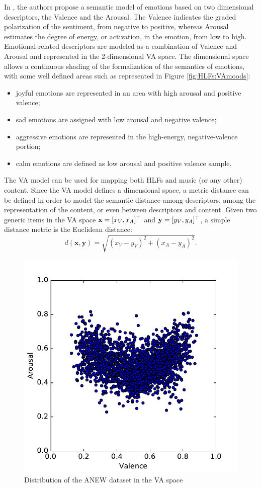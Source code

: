 In \cite{Russell1980}, the authors propose a semantic model of emotions based on two dimensional descriptors, the Valence and the Arousal. The Valence indicates the graded polarization of the sentiment, from negative to positive, whereas Arousal estimates the degree of energy, or activation, in the emotion, from low to high. Emotional-related descriptors are modeled as a combination of Valence and Arousal and represented in the 2-dimensional VA space. The dimensional space allows a continuous shading of the formalization of the semantics of emotions, with some well defined areas such as represented in Figure \ref{fig:HLFs:VAmoods}: 
\begin{itemize}
\item joyful emotions are represented in an area with high arousal and positive valence; 
\item sad emotions are assigned with low arousal and negative valence;
\item aggressive emotions are represented in the high-energy, negative-valence portion;
\item calm emotions are defined as low arousal and positive valence sample.
\end{itemize}

The VA model can be used for mapping both HLFs and music (or any other) content. Since the VA model defines a dimensional space, a metric distance can be defined in order to model the semantic distance among descriptors, among the representation of the content, or even between descriptors and content. Given two generic items in the VA space $\mathbf{x}=[x_V,x_A]^\top $ and $\mathbf{y}=[y_V, y_A]^\top$, a simple distance metric is the Euclidean distance:
\begin{equation}
d(\mathbf{x},\mathbf{y})=\sqrt{(x_V-y_V)^2+(x_A-y_A)^2}.
\end{equation}

\begin{figure}[bt] 
	\centering 
	\includegraphics[width=0.75\columnwidth]{img/ANEW/ANEW.pdf}
	\caption{Distribution of the ANEW dataset in the VA space}
	\label{fig:HLFs:ANEW}
\end{figure}	

